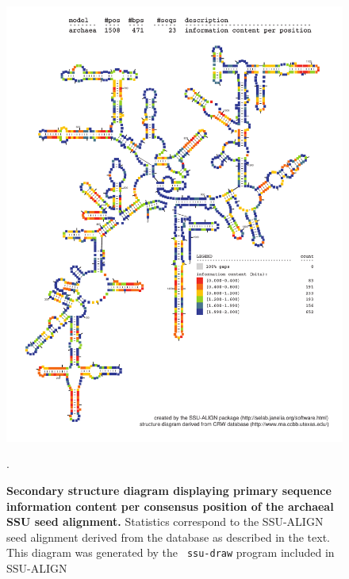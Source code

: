 \begin{figure}
\begin{center}
\includegraphics[width=5.64in]{Figures/archaea-0p1-info}
\end{center}
\caption[Secondary structure diagram displaying primary sequence
  information content per consensus position of the archaeal SSU seed
  alignment]{\textbf{Secondary structure diagram displaying primary
  sequence information content per consensus position of the archaeal SSU seed
  alignment.} Statistics correspond to the SSU-ALIGN seed
  alignment derived from the  database \cite{CannoneGutell02}
  as described in the text. This diagram was generated by the {\tt
  ssu-draw} program included in SSU-ALIGN}.
\label{fig:arcinfo}
\end{figure}

\newpage 

